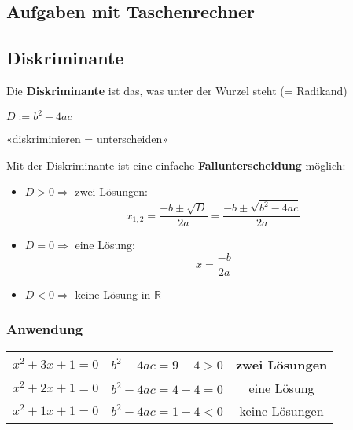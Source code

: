 {\subsection*{Aufgaben mit Taschenrechner}


\newpage


\subsection{Diskriminante}
Die \textbf{Diskriminante} ist das, was unter der Wurzel steht (= Radikand)

$D := b^2 - 4ac$

«diskriminieren = unterscheiden»

Mit der Diskriminante ist eine einfache \textbf{Fallunterscheidung} möglich:
\begin{itemize}
\item $D > 0 \Rightarrow $ zwei Lösungen:
  $$x_{1,2} = \frac{-b \pm \sqrt{D}}{2a} = \frac{-b \pm \sqrt{b^2 -
    4ac}}{2a}$$

\item $D = 0 \Rightarrow $ eine Lösung:
  $$ x = \frac{-b}{2a}$$

\item $D < 0 \Rightarrow $ keine Lösung in $\mathbb{R}$

\end{itemize}

\subsubsection{Anwendung}

\begin{tabular}{c|c|c}
  $x^2 + 3x +1 = 0$ & $b^2-4ac = 9 -4 > 0$ & zwei Lösungen \\
  \hline
  $x^2 + 2x +1 = 0$ & $b^2-4ac = 4 -4 = 0$ & eine Lösung \\
  \hline
  $x^2 + 1x +1 = 0$ & $b^2-4ac = 1 -4 < 0$ & keine Lösungen \\
\end{tabular}




}
